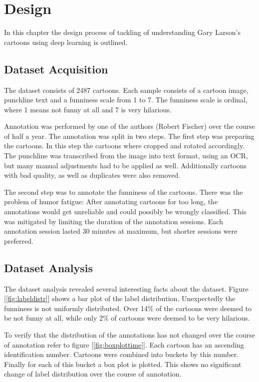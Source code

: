 \documentclass[draft,final,oneside]{vutinfth} %
\begin{document}
\chapter{Design} \label{design}

In this chapter the design process of tackling of understanding Gary Larson's cartoons using deep learning is outlined.


\section{Dataset Acquisition}
The dataset consists of 2487 cartoons. Each sample consists of a cartoon image, punchline text and a funniness scale from 1 to 7. The funniness scale is ordinal, where 1 means not funny at all and 7 is very hilarious.

Annotation was performed by one of the authors (Robert Fischer) over the course of half a year. The annotation was split in two steps. The first step was preparing the cartoons. In this step the cartoons where cropped and rotated accordingly. The punchline was transcribed from the image into text format, using an OCR, but many manual adjustments had to be applied as well. Additionally cartoons with bad quality, as well as duplicates were also removed.

The second step was to annotate the funniness of the cartoons. There was the problem of humor fatigue: After annotating cartoons for too long, the annotations would get unreliable and could possibly be wrongly classified. This was mitigated by limiting the duration of the annotation sessions. Each annotation session lasted 30 minutes at maximum, but shorter sessions were preferred. 

\section{Dataset Analysis}

The dataset analysis revealed several interesting facts about the dataset. Figure [\ref{fig:labeldistr}] shows a bar plot of the label distribution. Unexpectedly the funniness is not uniformly distributed. Over 14\% of the cartoons were deemed to be not funny at all, while only 2\% of cartoons were deemed to be very hilarious.

To verify that the distribution of the annotations has not changed over the course of annotation refer to figure [\ref{fig:boxplottime}]. Each cartoon has an ascending identification number. Cartoons were  combined into buckets by this number. Finally for each of this bucket a box plot is plotted. This shows no significant change of label distribution over the course of annotation.
\end{document}
